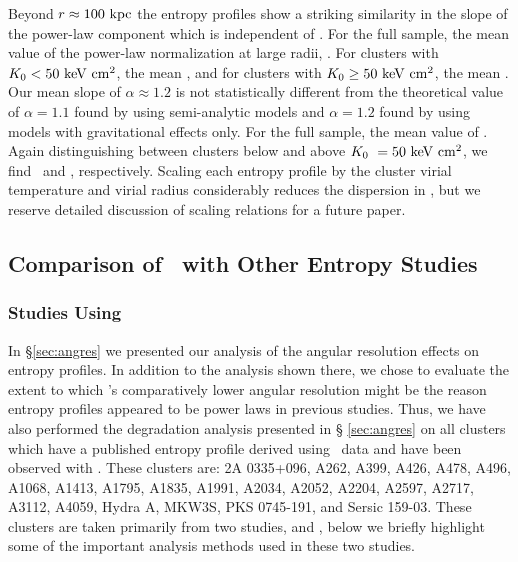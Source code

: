\documentclass[12pt,preprint]{aastex}
\begin{document}
Beyond $r \approx 100 \mbox{\ensuremath{\mathrm{~kpc}}}$ the entropy profiles show a striking
similarity in the slope of the power-law component which is
independent of \kna. For the full sample, the mean value of the
power-law normalization at large radii, \alphafs. For clusters with
$K_0 < 50 \mathrm{\mbox{\ensuremath{\mathrm{~keV}}} \mathrm{\mbox{\ensuremath{\mathrm{~cm}}}^2}}$, the mean \alphaga, and for clusters with $K_0 \geq
50 \mathrm{\mbox{\ensuremath{\mathrm{~keV}}} \mathrm{\mbox{\ensuremath{\mathrm{~cm}}}^2}}$, the mean \alphagb. Our mean slope of $\alpha \approx 1.2$ is
not statistically different from the theoretical value of $\alpha =
1.1$ found by \citet{tozzi01} using semi-analytic models and $\alpha =
1.2$ found by \citet{vkb05} using models with gravitational effects
only. For the full sample, the mean value of \khunfs. Again
distinguishing between clusters below and above $K_0\ = 50 \mathrm{\mbox{\ensuremath{\mathrm{~keV}}} \mathrm{\mbox{\ensuremath{\mathrm{~cm}}}^2}}$, we
find \khunga\ and \khungb, respectively. Scaling each entropy profile
by the cluster virial temperature and virial radius considerably
reduces the dispersion in \khun, but we reserve detailed discussion of
scaling relations for a future paper.

\subsection{Comparison of \accept\ with Other Entropy Studies}
\label{sec:comp}

\subsubsection{Studies Using \xmm}

In \S \ref{sec:angres} we presented our analysis of the angular
resolution effects on entropy profiles. In addition to the analysis
shown there, we chose to evaluate the extent to which \xmm's
comparatively lower angular resolution might be the reason entropy
profiles appeared to be power laws in previous studies. Thus, we have
also performed the degradation analysis presented in \S
\ref{sec:angres} on all clusters which have a published entropy
profile derived using \xmm\ data and have been observed with
\chandra. These clusters are: 2A 0335+096, A262, A399, A426, A478,
A496, A1068, A1413, A1795, A1835, A1991, A2034, A2052, A2204, A2597,
A2717, A3112, A4059, Hydra A, MKW3S, PKS 0745-191, and Sersic
159-03. These clusters are taken primarily from two studies,
\citet{piffaretti05} and \citet{pratt06}, below we briefly highlight
some of the important analysis methods used in these two studies.
\end{document}
